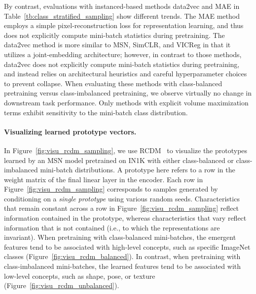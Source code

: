 \documentclass{article} %
\begin{document}
By contrast, evaluations with instanced-based methods data2vec and MAE in Table~\ref{tb:class_stratified_sampling} show different trends.
The MAE method employs a simple pixel-reconstruction loss for representation learning, and thus does not explicitly compute mini-batch statistics during pretraining.
The data2vec method is more similar to MSN, SimCLR, and VICReg in that it utilizes a joint-embedding architecture; however, in contrast to those methods, data2vec does not explicitly compute mini-batch statistics during pretraining, and instead relies on architectural heuristics and careful hyperparameter choices to prevent collapse.
When evaluating these methods with class-balanced pretraining versus class-imbalanced pretraining, we observe virtually no change in downstream task performance.
Only methods with explicit volume maximization terms exhibit sensitivity to the mini-batch class distribution.

\paragraph{Visualizing learned prototype vectors.}
In Figure~\ref{fig:visu_rcdm_sampling}, we use RCDM~\citep{bordes2022high} to visualize the prototypes learned by an MSN model pretrained on IN1K with either class-balanced or class-imbalanced mini-batch distributions.
A prototype here refers to a row in the weight matrix of the final linear layer in the encoder.
Each row in Figure~\ref{fig:visu_rcdm_sampling} corresponds to samples generated by conditioning on a \emph{single prototype} using various random seeds.
Characteristics that remain constant across a row in Figure~\ref{fig:visu_rcdm_sampling} reflect information contained in the prototype, whereas characteristics that vary reflect information that is not contained (i.e., to which the representations are invariant).
When pretraining with class-balanced mini-batches, the emergent features tend to be associated with high-level concepts, such as specific ImageNet classes (Figure~\ref{fig:visu_rcdm_balanced}).
In contrast, when pretraining with class-imbalanced mini-batches, the learned features tend to be associated with low-level concepts, such as shape, pose, or texture (Figure~\ref{fig:visu_rcdm_unbalanced}).
\end{document}
